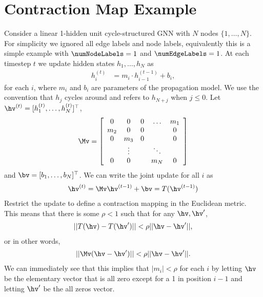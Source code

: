 
\newpage
\appendix

\section{Contraction Map Example}
\label{appendix:contraction-example}

Consider a linear 1-hidden unit cycle-structured GNN with $N$ nodes
$\{1,\dots, N\}$. For simplicity we ignored all edge labels and node labels,
equivalently this is a simple example with $\numNodeLabels=1$ and
$\numEdgeLabels=1$.
At each timestep $t$ we update hidden states $h_1, \ldots, h_N$
as
\begin{align}
  h_i^{(t)} & = m_{i} \cdot h_{i-1}^{(t-1)} + b_{i}, \label{eq:simple-recurrence}
\end{align}
%
for each $i$, where $m_i$ and $b_i$ are parameters of the propagation model.  We use the convention that
$h_{j}$ cycles around and refers to $h_{N+j}$
when $j \le 0$.
Let $\hv^{(t)} = [h^{(t)}_1, \ldots, h^{(t)}_N]^\top$,
\begin{align}
  \Mv = \left[
    \begin{array}{ccccc}
      0   & 0      & 0      & \ldots  & m_1 \\
      m_2 & 0      & 0      &         & 0 \\
      0   & m_3    & 0      &         & 0 \\
          & \vdots &        & \ddots  &  \\
      0   & 0      &        & m_{N}   & 0 
    \end{array}
    \right]
\end{align}
and $\bv = [b_1, \ldots, b_{N}]^\top$.
We can write the joint update for all $i$ as
\begin{align}
  \hv^{(t)} = \Mv \hv^{(t-1)} + \bv = T(\hv^{(t-1)})
\end{align}
%
Restrict the update to define a contraction mapping in the
Euclidean metric. This means that there is some $\rho < 1$ such that for any $\hv, \hv'$,
\begin{align}\label{eq:contraction-map-definition}
||T(\hv) - T(\hv') || < \rho ||\hv - \hv'||,
\end{align}
or in other words,
\begin{align}
|| \Mv (\hv - \hv') || < \rho ||\hv - \hv'||.
\end{align}
%
We can immediately see that this implies that $|m_i| < \rho$ for
each $i$ by letting $\hv$ be the elementary vector that is all
zero except for a 1 in position $i-1$ and letting $\hv'$ be the all zeros vector.

